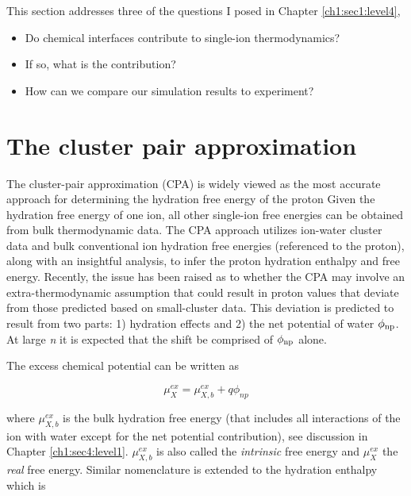 \begin{cpa}
  This section addresses three of the questions I posed in Chapter \ref{ch1:sec1:level4},
   
   \begin{itemize}
       \item Do chemical interfaces contribute to single-ion thermodynamics? 
       \item If so, what is the contribution?
       \item How can we compare our simulation results to experiment?
   \end{itemize}
  
  \section{\label{ch5:sec1:level1}The cluster pair approximation}
  The cluster-pair approximation\cite{coe1998cpa1} (CPA) is widely viewed as the most accurate approach for determining the hydration free energy of the 
  proton\cite{camaioni2005stdstcorr,kelly2006cpa} Given the hydration free energy of one ion, all other single-ion free energies can be obtained from bulk 
  thermodynamic data\cite{conway1978evaluation,marcus1985book}. The CPA approach utilizes ion-water cluster data and bulk conventional ion hydration free energies 
  (referenced to the proton), along with an insightful analysis, to infer the proton hydration enthalpy and free energy. Recently, the issue has been
  raised as to whether the CPA may involve an extra-thermodynamic assumption that could result in proton values that deviate from those predicted based
  on small-cluster data\cite{donald2010expand_cpa,hunenberger2011sp,vlcek2013cpa,vlcek2016cpareview}. This deviation is predicted to result from two
  parts: 1) hydration effects and 2) the net potential of water $\phi_{\mathrm{np}}$. At large \emph{n} it is expected that the shift be comprised of 
  $\phi_{\mathrm{np}}$ alone.

  The excess chemical potential can be written as\cite{aquaincognita2014} 
  
  \begin{equation} 
    \mu_X^{ex} = \mu_{X,b}^{ex} + q\phi_{np}
    \label{eq:echemmu}
  \end{equation}

  \noindent where $\mu_{X,b}^{ex}$ is the bulk hydration free energy (that includes all interactions of the ion with water except for the net potential 
  contribution), see discussion in Chapter \ref{ch1:sec4:level1}. $\mu_{X,b}^{ex}$ is also called the \emph{intrinsic} free energy\cite{hunenberger2011sp}
  and $\mu_X^{ex}$ the \emph{real} free energy. Similar nomenclature is extended to the hydration enthalpy which is
  

\end{cpa}
